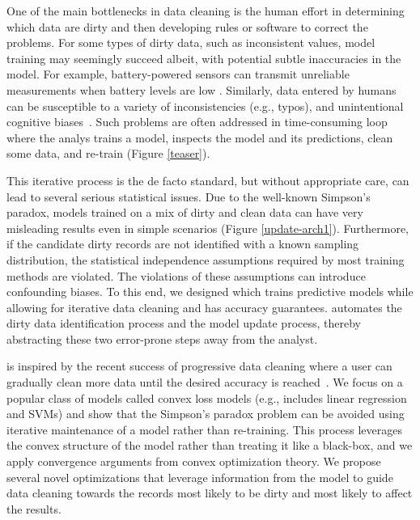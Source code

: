 One of the main bottlenecks in data cleaning is the human effort in determining which data are dirty and then developing rules or software to correct the problems.
For some types of dirty data, such as inconsistent values, model training may seemingly succeed albeit, with potential subtle inaccuracies in the model.
For example, battery-powered sensors can transmit unreliable measurements when battery levels are low \cite{DBLP:conf/pervasive/JefferyAFHW06}. 
Similarly, data entered by humans can be susceptible to a variety of inconsistencies (e.g., typos), and unintentional cognitive biases~\cite{DBLP:conf/recsys/KrishnanPFG14}.
Such problems are often addressed in time-consuming loop where the analys trains a model, inspects the model and its predictions, clean some data, and re-train (Figure \ref{teaser}).

This iterative process is the de facto standard, but without appropriate care, can lead to several serious statistical issues.
Due to the well-known Simpson's paradox, models trained on a mix of dirty and clean data can have very misleading results even in simple scenarios (Figure \ref{update-arch1}).
Furthermore, if the candidate dirty records are not identified with a known sampling distribution, the statistical independence assumptions required by most training methods are violated. 
The violations of these assumptions can introduce confounding biases.
To this end, we designed \sys which trains predictive models while allowing for iterative data cleaning and has accuracy guarantees.
\sys automates the dirty data identification process and the model update process, thereby abstracting these two error-prone steps away from the analyst.

\sys is inspired by the recent success of progressive data cleaning where a user can gradually clean more data until the desired accuracy is reached~\cite{altowim2014progressive, whang2014incremental, papenbrock2015progressive, gruenheid2014incremental, mayfield2010eracer, DBLP:journals/pvldb/YakoutENOI11, yakout2013don}.
We focus on a popular class of models called convex loss models (e.g., includes linear regression and SVMs) and show that the Simpson's paradox problem can be avoided using iterative maintenance of a model rather than re-training.
This process leverages the convex structure of the model rather than treating it like a black-box, and we apply convergence arguments from convex optimization theory.
We propose several novel optimizations that leverage information from the model to guide data cleaning towards the records most likely to be dirty and most likely to affect the results.

